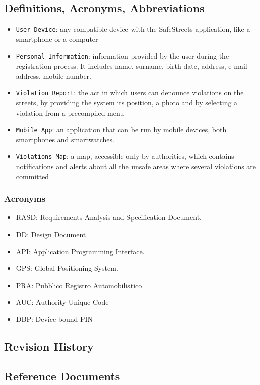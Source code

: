 \documentclass[12pt,a4paper]{article}
\begin{document}
\subsection{Definitions, Acronyms, Abbreviations}
			\begin{itemize}
				\item \texttt{User Device}: any compatible device with the SafeStreets application, like a smartphone or a computer
				\item \texttt{Personal Information}: information provided by the user during the registration process. It includes name, surname, birth date, address, e-mail address, mobile number.
				\item \texttt{Violation Report}: the act in which users can denounce violations on the streets, by providing the system its position, a photo and by selecting a violation from a precompiled menu
				\item \texttt{Mobile App}: an application that can be run by mobile devices, both smartphones and smartwatches.
				\item \texttt{Violations Map}: a map, accessible only by authorities, which contains notifications and alerts about all the unsafe areas where several violations are committed
			\end{itemize}
		\subsubsection{Acronyms}
			\begin{itemize}
				\item RASD: Requirements Analysis and Specification Document.
				\item DD: Design Document
				\item API: Application Programming Interface.
				\item GPS: Global Positioning System.
				\item PRA: Pubblico Registro Automobilistico
				\item AUC: Authority Unique Code
				\item DBP: Device-bound PIN
			\end{itemize}
\subsection{Revision History}
\subsection{Reference Documents}
\end{document}
